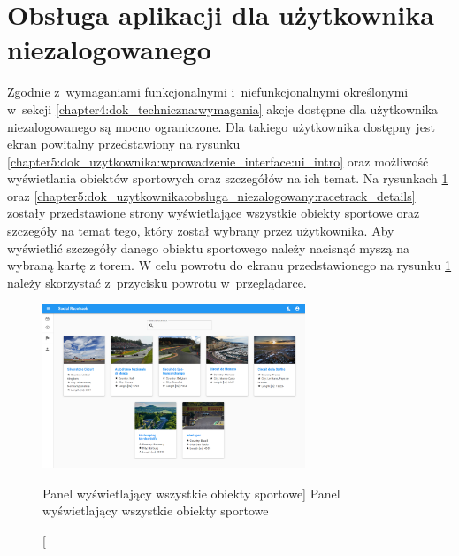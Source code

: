 \documentclass[../Kamil_Kowalewski_Main.tex]{subfiles}
\begin{document}
{    \section{Obsługa aplikacji dla użytkownika niezalogowanego}
    \label{chapter5:dok_uzytkownika:obsluga_niezalogowany} {
        Zgodnie z~wymaganiami funkcjonalnymi i~niefunkcjonalnymi określonymi w~sekcji
        \ref{chapter4:dok_techniczna:wymagania} akcje dostępne dla użytkownika
        niezalogowanego są mocno ograniczone. Dla takiego użytkownika dostępny jest
        ekran powitalny przedstawiony na rysunku
        \ref{chapter5:dok_uzytkownika:wprowadzenie_interface:ui_intro} oraz możliwość
        wyświetlania obiektów sportowych oraz szczegółów na ich temat. Na rysunkach
        \ref{chapter5:dok_uzytkownika:obsluga_niezalogowany:racetracks} oraz
        \ref{chapter5:dok_uzytkownika:obsluga_niezalogowany:racetrack_details}
        zostały przedstawione strony wyświetlające wszystkie obiekty
        sportowe oraz szczegóły na temat tego, który został wybrany przez użytkownika.
        Aby wyświetlić szczegóły danego obiektu sportowego należy nacisnąć myszą
        na wybraną kartę z torem. W celu powrotu do ekranu przedstawionego na rysunku
        \ref{chapter5:dok_uzytkownika:obsluga_niezalogowany:racetracks} należy
        skorzystać z~przycisku powrotu w~przeglądarce.
        \begin{figure}[H]
            \centering
            \includegraphics[width=0.7\textwidth, keepaspectratio]
            {img/chapter5/notloggedin/racetracks.png}
            \caption
            [Panel wyświetlający wszystkie obiekty sportowe]
            {Panel wyświetlający wszystkie obiekty sportowe}
            \label{chapter5:dok_uzytkownika:obsluga_niezalogowany:racetracks}
        \end{figure}

}}
\end{document}
